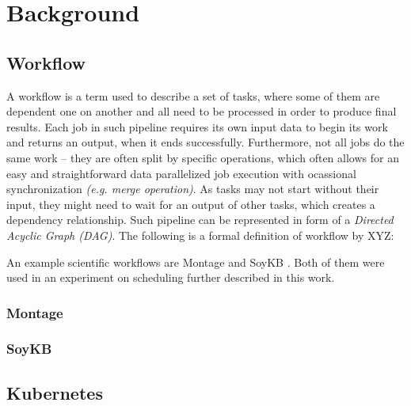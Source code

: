 
\section{Background} \label{section:background}



\subsection{Workflow}
\label{subsection:Workflow}

A workflow is a term used to describe a set of tasks, where some of them are dependent one on another and all need to be processed in order to produce final results.
Each job in such pipeline requires its own input data to begin its work and returns an output, when it ends successfully.
Furthermore, not all jobs do the same work -- they are often split by specific operations, which often allows for an easy and straightforward data parallelized job execution with ocassional synchronization \emph{(e.g. merge operation)}.    
As tasks may not start without their input, they might need to wait for an output of other tasks, which creates a dependency relationship.
Such pipeline can be represented in form of a \emph{Directed Acyclic Graph (DAG)}.
The following is a formal definition of workflow by XYZ:


An example scientific workflows are Montage \cite{Montage} and SoyKB \cite{SoyKB}.
Both of them were used in an experiment on scheduling further described in this work.


\subsubsection{Montage}


\subsubsection{SoyKB}


\subsection{Kubernetes}
\label{subsection:Kubernetes}

